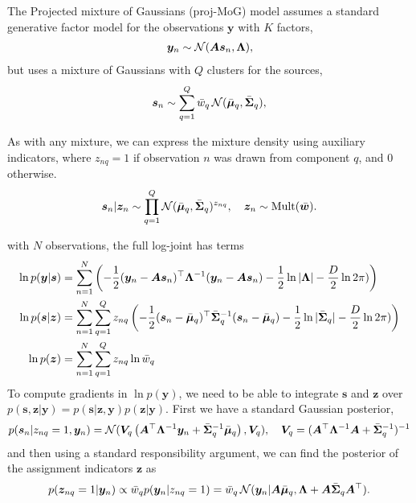 \documentclass{article}
\newcommand{\mix}{\bm{A}}
\newcommand{\source}{s}
\newcommand{\sourcevec}{\bm{\source}}
\newcommand{\obs}{y}
\newcommand{\obsvec}{\bm{\obs}}
\newcommand{\mean}{\mu}
\newcommand{\meanvec}{\bm{\mean}}
\newcommand{\weight}{w}
\newcommand{\compweight}{\bar{\weight}}
\newcommand{\compweightvec}{\bar{\bm{\weight}}}
\newcommand{\assign}{z}
\newcommand{\assignvec}{\bm{\assign}}
\newcommand{\compmeanvec}{\bar{\meanvec}}
\newcommand{\compcov}{\bar{\bm{\Sigma}}}
\newcommand{\noisecov}{\bm{\Lambda}}
\begin{document}
The Projected mixture of Gaussians (proj-MoG) model assumes a standard generative factor model for the observations $\bm{y}$ with $K$ factors,  
\begin{align*}
\obsvec_n\sim \gaussrnd(\mix\sourcevec_n,\noisecov),
\end{align*}
but uses a mixture of Gaussians with $Q$ clusters for the sources,
\begin{align*}
\sourcevec_{n}\sim \sum_{q=1}^{Q}\compweight_{q}\gaussrnd(\compmeanvec_{q},\compcov_{q}),
\end{align*}

As with any mixture, we can express the mixture density using auxiliary indicators, where $\assign_{nq}=1$ if observation $n$ was drawn from component $q$, and $0$ otherwise.
\begin{equation}
\sourcevec_n\cond \assignvec_n\sim\prod_{q=1}^Q\gaussrnd(\compmeanvec_{q},\compcov_q)^{\assign_{nq}},\quad \assignvec_n\sim \multrnd(\compweightvec).
\end{equation}

with $N$ observations, the full log-joint has terms
\begin{align*}
\ln p(\obsvec|\sourcevec)&=\sum_{n=1}^{N}\left(-\frac{1}{2}(\obsvec_n-\mix\sourcevec_n)\T\noisecov^{-1}(\obsvec_n-\mix\sourcevec_n)-\frac{1}{2}\ln|\noisecov|-\frac{D}{2}\ln 2\pi)\right)\\
\ln p(\sourcevec|\assignvec)&=\sum_{n=1}^{N}\sum_{q=1}^{Q}\assign_{nq}\left(-\frac{1}{2}(\sourcevec_n-\compmeanvec_q)\T\compcov^{-1}_q(\sourcevec_n-\compmeanvec_q)-\frac{1}{2}\ln|\compcov_q|-\frac{D}{2}\ln 2\pi)\right)\\
\ln p(\assignvec)&=\sum_{n=1}^{N}\sum_{q=1}^{Q}\assign_{nq}\ln \compweight_{q}
\end{align*}
To compute gradients in $\ln p(\obsvec)$, we need to be able to integrate $\sourcevec$ and $\assignvec$ over $p(\sourcevec,\assignvec|\obsvec)=p(\sourcevec|\assignvec,\obsvec)p(\assignvec|\obsvec)$. First we have a standard Gaussian posterior,
\begin{equation}
p(\sourcevec_n|\assign_{nq}=1,\obsvec_n)=\gaussrnd(\bm{V}_q\left(\mix\T\noisecov^{-1}\obsvec_n + \compcov_q^{-1}\compmeanvec_q\right),\bm{V}_q),\quad \bm{V}_q=(\mix\T\noisecov^{-1}\mix+\compcov^{-1}_q)^{-1}
\end{equation}
and then using a standard responsibility argument, we can find the posterior of the assignment indicators $\assignvec$ as
\begin{equation}
p(\assignvec_{nq}=1|\obsvec_n)\propto \compweight_{q}p(\obsvec_n|\assign_{nq}=1)=\compweight_{q}\gaussrnd(\obsvec_n|\mix\compmeanvec_q,\noisecov+\mix\compcov_q\mix\T).
\end{equation}
\end{document}
